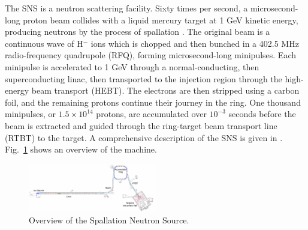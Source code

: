 The SNS is a neutron scattering facility. Sixty times per second, a microsecond-long proton beam collides with a liquid mercury target at 1 GeV kinetic energy, producing neutrons by the process of spallation \cite{Russell1990}. The original beam is a continuous wave of H$^-$ ions which is chopped and then bunched in a 402.5 MHz radio-frequency quadrupole (RFQ), forming microsecond-long minipulses. Each minipulse is accelerated to 1 GeV through a normal-conducting, then superconducting linac, then transported to the injection region through the high-energy beam transport (HEBT). The electrons are then stripped using a carbon foil, and the remaining protons continue their journey in the ring. One thousand minipulses, or $1.5 \times 10^{14}$ protons, are accumulated over $10^{-3}$ seconds before the beam is extracted and guided through the ring-target beam transport line (RTBT) to the target. A comprehensive description of the SNS is given in \cite{Henderson2014}. Fig.~\ref{fig:SNS} shows an overview of the machine.
%
\begin{figure}[!p]
    \centering
    \includegraphics[angle=-90, width=0.5\textwidth]{Images/chapter1/SNS.png}
    \caption{Overview of the Spallation Neutron Source.}
    \label{fig:SNS}
\end{figure}
%

